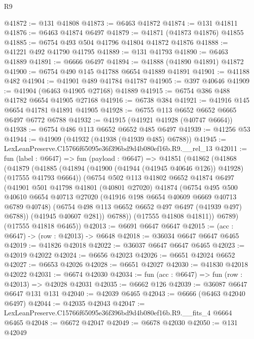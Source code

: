 \begin{lexlean}{R9}
\begin{coremodule}
@41872 := @131 @41808
@41873 := @6463 @41872
@41874 := @131 @41811
@41876 := @6463 @41874 @6497
@41879 := @41871 (@41873 @41876) @41855
@41885 := @6754 @493 @504 @41796 @41804 @41872 @41876
@41888 := @41221 @492 @41790 @41795
@41889 := @131 @41793
@41890 := @6463 @41889
@41891 := @6666 @6497
@41894 := @41888 (@41890 @41891) @41872
@41900 := @6754 @490 @145 @41788 @6654 @41889 @41891
@41901 := @41188 @482
@41904 := @41901 @489 @41784 @41787
@41905 := @397 @40646
@41909 := @41904 (@6463 @41905 @27168) @41889
@41915 := @6754 @386 @488 @41782 @6654 @41905 @27168
@41916 := @6738 @384
@41921 := @41916 @145 @6654 @41781 @41891 @41905
@41928 := @6755 @113 @6652 @6652 @6665 @6497 @6772 @6788
@41932 := @41915 (@41921 @41928 (@40747 @6664))
@41938 := @6754 @486 @113 @6652 @6652 @485 @6497
@41939 := @41256 @53
@41944 := @41909 (@41932 (@41938 (@41939 @485) @6788))
@41945 := LexLeanPreserve.C15766f65095e36f396bd9d4b080ef16b.R9.__rel_13
@42011 := fun (label : @6647) =>
  fun (payload : @6647) =>
  @41851
    (@41862
      (@41868
        (@41879
          (@41885
            (@41894 (@41900 (@41944 (@41945 @40646 @126)) @41928) (@17555 @41793 @6664))
            (@6754
              @502
              @113
              @41802
              @6652
              @41874
              @6497
              (@41901
                @501
                @41798
                @41801
                (@40801 @27020)
                @41874
                (@6754
                  @495
                  @500
                  @40610
                  @6654
                  @40713
                  @27020
                  (@41916 @198 @6654 @40609 @6669 @40713 @6789 @40748)
                  (@6754 @498 @113 @6652 @6652 @497 @6497 (@41939 @497) @6788))
                (@41945 @40607 @281))
              @6788))
          (@17555 @41808 @41811))
        @6789)
      (@17555 @41818 @6465))
@42013 := @6691 @6647 @6647
@42015 := (acc : @6647) -> (row : @42013) -> @6648
@42018 := @36034 @6647 @6647 @6465
@42019 := @41826 @42018
@42022 := @36037 @6647 @6647 @6465
@42023 := @42019 @42022
@42024 := @6656 @42023
@42026 := @6651 @42024 @6652
@42027 := @6653 @42026
@42028 := @6651 @42027
@42030 := @41830 @42018 @42022
@42031 := @6674 @42030
@42034 := fun (acc : @6647) => fun (row : @42013) => @42028 @42031
@42035 := @6662 @126
@42039 := @36087 @6647 @6647 @131 @131
@42040 := @42039 @6465
@42043 := @6666 (@6463 @42040 @6497)
@42044 := @42035 @42043
@42047 := LexLeanPreserve.C15766f65095e36f396bd9d4b080ef16b.R9.__fits_4 @6664 @6465
@42048 := @6672 @42047
@42049 := @6678 @42030
@42050 := @131 @42049

\end{coremodule}
\end{lexlean}
